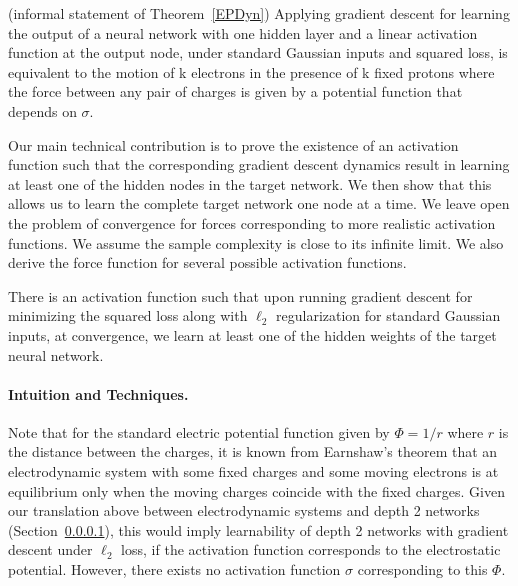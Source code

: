 \begin{theorem}(informal statement of Theorem~\ref{EPDyn})
Applying gradient descent for learning the output of a neural network
with one hidden layer and a linear activation function at the output
node, under standard Gaussian inputs and squared loss, 
is equivalent to the motion of k electrons in the presence of k fixed
protons where the force between any pair of charges is given by a
potential function that depends on $\sigma$.
\end{theorem}
%

Our main technical contribution is to prove the existence of an activation function such that the corresponding gradient descent dynamics result in learning at least one of the hidden nodes in the target network. We then show that this allows us to learn the complete target network one node at a time. We leave open the problem of convergence for forces corresponding to more realistic activation functions.
%
{\color{red} We assume the sample complexity is close to its infinite limit.  
We also derive the force function for several possible activation functions. }

%
\begin{theorem}
There is an activation function such that upon running gradient
  descent for minimizing the squared loss along with $\ell_2$
  regularization for standard Gaussian inputs, at convergence, 
  we learn at least one of
  the hidden weights of the target neural network.
\end{theorem}



\paragraph{Intuition and Techniques.}
%
Note that for the standard electric potential function given by $\Phi = 1/r$ where $r$ is the distance between the charges, it is known from Earnshaw's theorem that an electrodynamic system with some fixed charges and some moving electrons is at equilibrium only when the moving charges coincide with the fixed charges. Given our translation above between electrodynamic systems and depth 2 networks (Section~\ref{}), this would imply learnability of depth 2 networks with gradient descent under $\ell_2$ loss, if the activation function corresponds to the electrostatic potential. However, there exists no activation function $\sigma$ corresponding to this $\Phi$. 
%

